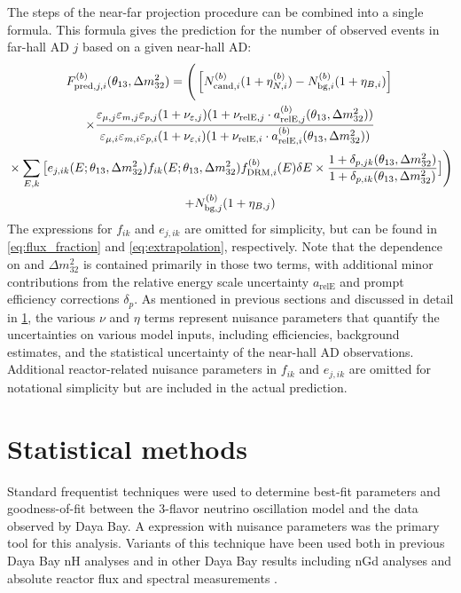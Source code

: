 The steps of the near-far projection procedure can be combined into a single formula.
This formula gives the prediction for the number of observed events
in far-hall AD $j$ based on a given near-hall AD:
\begin{multline}\label{eq:full_prediction}
    F_{\text{pred},j,i}^{(b)}(\theta_{13},\Delta m^2_{32}) =
    \Bigg(
    \left[N_{\text{cand},i}^{(b)}(1 + \eta_{N,i}^{(b)}) - N_{\text{bg},i}^{(b)}
    (1 + \eta_{B,i})\right]\bigg. \\
    \times \frac{
        \varepsilon_{\mu,j}\varepsilon_{m,j}\varepsilon_{p,j}
        (1 + \nu_{\varepsilon,j})
        (1 + \nu_{\text{relE},j}\cdot a_{\text{relE},j}^{(b)}(\theta_{13},\Delta m^2_{32}))
    }{
        \varepsilon_{\mu,i}\varepsilon_{m,i}\varepsilon_{p,i}
        (1+\nu_{\varepsilon,i})
        (1 + \nu_{\text{relE},i}\cdot a_{\text{relE},i}^{(b)}(\theta_{13},\Delta m^2_{32}))
    } \\
    \bigg.
    \times \sum_{E,k} \big[
        e_{j,ik}(E; \theta_{13},\Delta m^2_{32}) f_{ik}(E; \theta_{13},\Delta m^2_{32})
        f_{\text{DRM},i}^{(b)}(E) \delta E
    \times \frac{
        1 + \delta_{p,jk}(\theta_{13}, \Delta m^2_{32})
    }{
        1 + \delta_{p,ik}(\theta_{13}, \Delta m^2_{32})
    } \big] \Bigg) \\
    + N_{\text{bg},j}^{(b)}(1 + \eta_{B,j})
\end{multline}
The expressions for $f_{ik}$ and $e_{j,ik}$ are omitted for simplicity,
but can be found in \cref{eq:flux_fraction} and \cref{eq:extrapolation}, respectively.
Note that the dependence on \thetaot{} and $\Delta m^2_{32}${}
is contained primarily in those two terms,
with additional minor contributions from the relative energy scale uncertainty
$a_\text{relE}$ and prompt efficiency corrections $\delta_p$.
As mentioned in previous sections and discussed in detail in \cref{sec:fitter},
the various $\nu$ and $\eta$ terms represent nuisance parameters
that quantify the uncertainties on various model inputs,
including efficiencies, background estimates,
and the statistical uncertainty of the near-hall AD observations.
Additional reactor-related nuisance parameters in $f_{ik}$ and $e_{j,ik}$ are omitted
for notational simplicity but are included in the actual prediction.

\section{Statistical methods}
\label{sec:fitter}

Standard frequentist techniques were used to determine best-fit parameters
and goodness-of-fit between the 3-flavor neutrino oscillation model
and the data observed by Daya Bay.
A \chisquare{} expression with nuisance parameters
was the primary tool for this analysis.
Variants of this technique have been used both in previous Daya Bay nH analyses
and in other Daya Bay results including nGd \thetaot{} analyses
and absolute reactor \nuebar{} flux and spectral measurements
\cite{nh2016,ngd2016,reactorflux2017,extractionreactorflux2019}.

